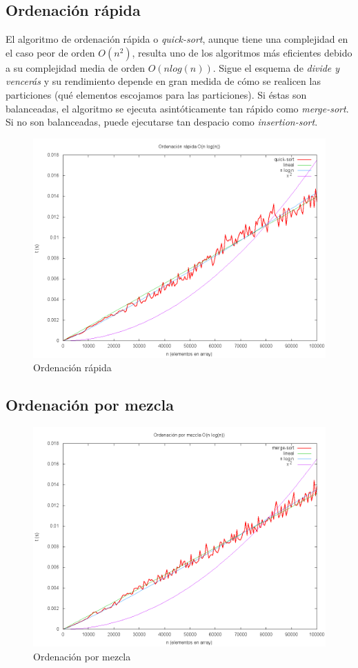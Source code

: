 \subsection{Ordenación rápida}
El algoritmo de ordenación rápida o \textit{quick-sort}, aunque tiene una complejidad en el caso peor de orden $O(n^2)$, resulta uno de los algoritmos más eficientes debido a su complejidad media de orden $O(nlog(n))$.  Sigue el esquema de \textit{divide y vencerás} y su rendimiento depende en gran medida de cómo se realicen las particiones (qué elementos escojamos para las particiones).  Si éstas son balanceadas, el algoritmo se ejecuta asintóticamente tan rápido como \textit{merge-sort}.  Si no son balanceadas, puede ejecutarse tan despacio como \textit{insertion-sort}.\cite{CORMEN}
	\begin{figure}[H]
  		\centering
   	 	\includegraphics[width=1.0\textwidth]{quick-sort.png}
  		\caption{Ordenación rápida}
  		\label{fig:quick}
	\end{figure}
	
\subsection{Ordenación por mezcla}

	\begin{figure}[H]
  		\centering
   	 	\includegraphics[width=1.0\textwidth]{merge-sort.png}
  		\caption{Ordenación por mezcla}
  		\label{fig:merge}
	\end{figure}
